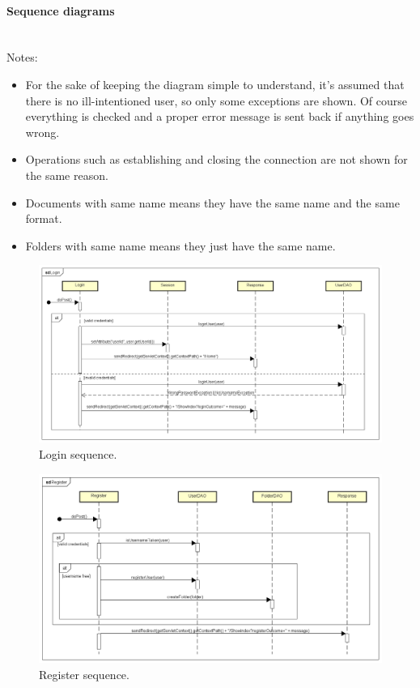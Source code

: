 \documentclass[a4paper,12pt]{article}
\newcommand{\myparagraph}[1]{\paragraph{#1}\mbox{}\\}
\begin{document}
\myparagraph{Sequence diagrams}
Notes:
\begin{itemize} 
	\item{For the sake of keeping the diagram simple to understand, it's assumed that there is no ill-intentioned user, so only some exceptions are shown. Of course everything is checked and a proper error message is sent back if anything goes wrong.}
	\item{Operations such as establishing and closing the connection are not shown for the same reason.}
	\item{Documents with same name means they have the same name and the same format.}
	\item{Folders with same name means they just have the same name.}
\end{itemize}
\begin{figure}[H]
    \centering
    \includegraphics[width=1.0\textwidth]{HTML/SequenceDiagram/Login.png}
    \caption{Login sequence.}
\end{figure}

\begin{figure}[H]
    \centering
    \includegraphics[width=1.0\textwidth]{HTML/SequenceDiagram/Register.png}
    \caption{Register sequence.}
\end{figure}
    
\end{document}
